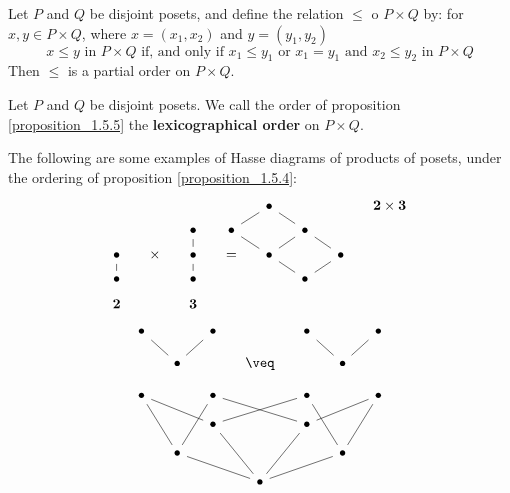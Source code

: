 \begin{proposition}\label{proposition_1.5.5}
  Let $P$ and $Q$ be disjoint posets, and define the relation $\leq$ o
   $P \times Q$ by: for $x,y \in P \times Q$, where $x=(x_1,x_2)$ and
   $y=(y_1,y_2)$
   \begin{equation*}
     x \leq y \text{ in } P \times Q \text{ if, and only if }
     x_1 \leq y_1 \text{ or } x_1=y_1 \text{ and } x_2 \leq y_2 \text{ in } P \times Q
   \end{equation*}
   Then $\leq$ is a partial order on $P \times Q$.
\end{proposition}

\begin{definition}
  Let $P$ and $Q$ be disjoint posets. We call the order of proposition
  \ref{proposition_1.5.5} the \textbf{lexicographical order} on $P
  \times Q$.
\end{definition}

\begin{example}\label{example_1.12}
  The following are some examples of Hasse diagrams of products of
  posets, under the ordering of proposition \ref{proposition_1.5.4}:
\[\begin{tikzcd}[column  sep=small, row  sep=tiny]
	&&&& \bullet &&& {\textbf{2} \times\textbf{3}} \\
	&& \bullet & \bullet && \bullet \\
	\bullet & \times & \bullet & {=} & \bullet && \bullet \\
	\bullet && \bullet &&& \bullet \\
	{\textbf{2}} && {\textbf{3}}
	\arrow[no head, from=1-5, to=2-6]
	\arrow[no head, from=2-4, to=1-5]
	\arrow[no head, from=2-6, to=3-7]
	\arrow[no head, from=3-3, to=2-3]
	\arrow[no head, from=3-5, to=2-4]
	\arrow[no head, from=3-5, to=2-6]
	\arrow[no head, from=3-7, to=4-6]
	\arrow[no head, from=4-1, to=3-1]
	\arrow[no head, from=4-3, to=3-3]
	\arrow[no head, from=4-6, to=3-5]
\end{tikzcd}\]
\[\begin{tikzcd}[column sep=small,row sep=small]
	\bullet && \bullet && \bullet && \bullet \\
	& \bullet && {\veq} && \bullet \\
	\bullet && \bullet && \bullet && \bullet \\
	&& \bullet && \bullet \\
	& \bullet &&&& \bullet \\
	&&& \bullet
	\arrow[no head, from=2-2, to=1-1]
	\arrow[no head, from=2-2, to=1-3]
	\arrow[no head, from=2-6, to=1-5]
	\arrow[no head, from=2-6, to=1-7]
	\arrow[no head, from=3-1, to=5-2]
	\arrow[no head, from=4-3, to=3-1]
	\arrow[no head, from=4-3, to=3-5]
	\arrow[no head, from=4-5, to=3-3]
	\arrow[no head, from=4-5, to=3-7]
	\arrow[no head, from=5-2, to=3-3]
	\arrow[no head, from=5-6, to=3-5]
	\arrow[no head, from=5-6, to=3-7]
	\arrow[no head, from=6-4, to=4-3]
	\arrow[no head, from=6-4, to=4-5]
	\arrow[no head, from=6-4, to=5-2]
	\arrow[no head, from=6-4, to=5-6]
\end{tikzcd}\]
\end{example}

